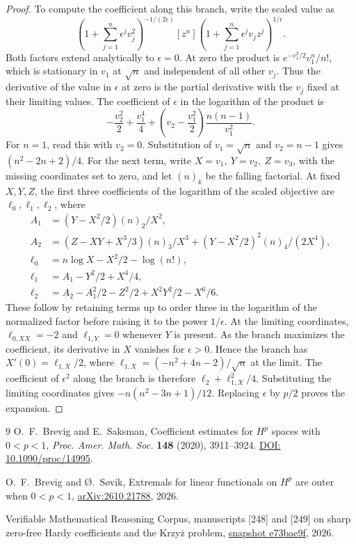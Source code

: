 \documentclass[11pt]{article}
\begin{document}
\begin{proof}
To compute the coefficient along this branch, write the scaled
value as
\[
 \left(1+\sum_{j=1}^n\epsilon^jv_j^2\right)^{-1/(2\epsilon)}
 [z^n]\left(1+\sum_{j=1}^n\epsilon^jv_jz^j\right)^{1/\epsilon}.
\]
Both factors extend analytically to \(\epsilon=0\).
At zero the product is \(e^{-v_1^2/2}v_1^n/n!\), which is
stationary in \(v_1\) at \(\sqrt n\) and independent of all
other \(v_j\). Thus the derivative of the value in \(\epsilon\)
at zero is the partial derivative with the \(v_j\) fixed at
their limiting values. The coefficient of \(\epsilon\) in the
logarithm of the product is
\[
 -\frac{v_2^2}{2}+\frac{v_1^4}{4}
   +\left(v_2-\frac{v_1^2}{2}\right)\frac{n(n-1)}{v_1^2}.
\]
For \(n=1\), read this with \(v_2=0\). Substitution of \(v_1=\sqrt n\)
and \(v_2=n-1\) gives \((n^2-2n+2)/4\).
For the next term, write \(X=v_1,\ Y=v_2,\ Z=v_3\), with the
missing coordinates set to zero, and let \((n)_k\) be the falling
factorial. At fixed \(X,Y,Z\), the first three coefficients of the
logarithm of the scaled objective are \(\ell_0,\ell_1,\ell_2\), where
\begin{align*}
 A_1&=\left(Y-X^2/2\right)(n)_2/X^2,\\
 A_2&=\left(Z-XY+X^3/3\right)(n)_3/X^3
       +\left(Y-X^2/2\right)^2(n)_4/(2X^4),\\
 \ell_0&=n\log X-X^2/2-\log(n!),\\
 \ell_1&=A_1-Y^2/2+X^4/4,\\
 \ell_2&=A_2-A_1^2/2-Z^2/2+X^2Y^2/2-X^6/6.
\end{align*}
These follow by retaining terms up to order three in the logarithm
of the normalized factor before raising it to the power
\(1/\epsilon\). At the limiting coordinates,
\(\ell_{0,XX}=-2\) and \(\ell_{1,Y}=0\) whenever \(Y\) is present.
As the branch maximizes the coefficient, its derivative in \(X\)
vanishes for \(\epsilon>0\). Hence the branch has
\(X'(0)=\ell_{1,X}/2\), where
\(\ell_{1,X}=(-n^2+4n-2)/\sqrt n\) at the limit. The
coefficient of \(\epsilon^2\) along the branch is therefore
\(\ell_2+\ell_{1,X}^2/4\). Substituting the limiting coordinates
gives \(-n(n^2-3n+1)/12\). Replacing \(\epsilon\) by \(p/2\)
proves the expansion.
\end{proof}



\begin{thebibliography}{9}
O.~F.~Brevig and E.~Saksman, Coefficient estimates for \(H^p\)
spaces with \(0<p<1\), \emph{Proc. Amer. Math. Soc.} \textbf{148}
(2020), 3911--3924.
\href{https://doi.org/10.1090/proc/14995}{DOI: 10.1090/proc/14995}.

O.~F.~Brevig and \O.~S{\o}vik, Extremals for linear functionals on
\(H^p\) are outer when \(0<p<1\),
\href{https://arxiv.org/abs/2610.21788}{arXiv:2610.21788}, 2026.

Verifiable Mathematical Reasoning Corpus, manuscripts [248] and
[249] on sharp zero-free Hardy coefficients and the Krzy\.z problem,
\href{https://github.com/QEEDDD/Verifiable-Mathematical-Reasoning-Corpus/tree/e73bae9fd0c319129b19aacc5c317f7abf2865ef}{snapshot e73bae9f},
2026.
\end{thebibliography}
\end{document}
